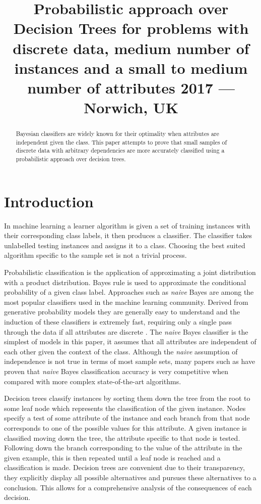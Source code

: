 \documentclass{cmppgr}
\title{Probabilistic approach over Decision Trees for problems with discrete data, medium number of instances and a small to medium number of attributes 2017 --- Norwich, UK}
\begin{document}
\maketitle

\begin{abstract}

Bayesian classifiers are widely known for their optimality when attributes are independent given the class. This paper attempts to prove that small samples of discrete data with arbitrary dependencies are more accurately classified using a probabilistic approach over decision trees. 


\end{abstract}


\section{Introduction}

In machine learning a learner algorithm is given a set of training instances with their corresponding class labels, it then produces a classifier. The classifier takes unlabelled testing instances and assigns it to a class. Choosing the best suited algorithm specific to the sample set is not a trivial process.

Probabilistic classification is the application of approximating a joint distribution with a product distribution. Bayes rule is used to approximate the conditional probability of a given class label. Approaches such as \textit{naive} Bayes are among the most popular classifiers used in the machine learning community. Derived from generative probability models they are generally easy to understand and the induction of these classifiers is extremely fast, requiring only a single pass through the data if all attributes are discrete \cite{kohavi1996scaling}. The \textit{naive} Bayes classifier is the simplest of models in this paper, it assumes that all attributes are independent of each other given the context of the class. Although the \textit{naive} assumption of independence is not true in terms of most sample sets, many papers such as \cite{domingos1997optimality} have proven that \textit{naive} Bayes classification accuracy is very competitive when compared with more complex state-of-the-art algorithms. 

 

Decision trees classify instances by sorting them down the tree from the root to some leaf node which represents the classification of the given instance. Nodes specify a test of some attribute of the instance and each branch from that node corresponds to one of the possible values for this attribute. A given instance is classified moving down the tree, the attribute specific to that node is tested. Following down the branch corresponding to the value of the attribute in the given example, this is then repeated until a leaf node is reached and a classification is made. Decision trees are convenient due to their transparency, they explicitly display all possible alternatives and pursues these alternatives to a conclusion. This allows for a comprehensive analysis of the consequences of each decision.
\end{document}
